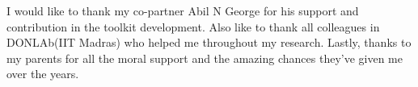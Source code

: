 \acknowledgements
I would like to thank my co-partner Abil N George for his
support and contribution in the toolkit development. Also like to thank all colleagues in DONLAb(IIT Madras) who helped me throughout my research.  Lastly, thanks to my parents for all the moral support and the amazing chances they've given me over the years.

